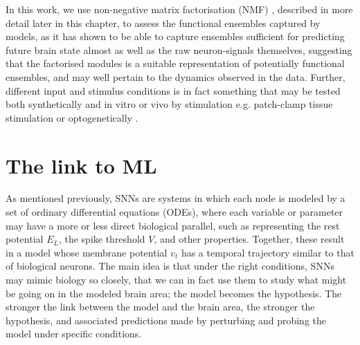 \documentclass[mphil,deptreport,ianc]{infthesis} %
\begin{document}
In this work, we use non-negative matrix factorisation (NMF) \cite{Seung1999, Seung2001}, described in more detail later in this chapter, to assess the functional ensembles captured by models, as it has shown to be able to capture ensembles sufficient for predicting future brain state almost as well as the raw neuron-signals themselves, suggesting that the factorised modules is a suitable representation of potentially functional ensembles, and may well pertain to the dynamics observed in the data.
Further, different input and stimulus conditions is in fact something that may be tested both synthetically and in vitro or vivo by stimulation e.g. patch-clamp tissue stimulation or optogenetically \cite{VanDort2015}.






\section{The link to ML}

As mentioned previously, SNNs are systems in which each node is modeled by a set of ordinary differential equations (ODEs), where each variable or parameter may have a more or less direct biological parallel, such as representing the rest potential $E_L$, the spike threshold $V$, and other properties.
Together, these result in a model whose membrane potential $v_t$ has a temporal trajectory similar to that of biological neurons.
The main idea is that under the right conditions, SNNs may mimic biology so closely, that we can in fact use them to study what might be going on in the modeled brain area; the model becomes the hypothesis.
The stronger the link between the model and the brain area, the stronger the hypothesis, and associated predictions made by perturbing and probing the model under specific conditions.
\end{document}
